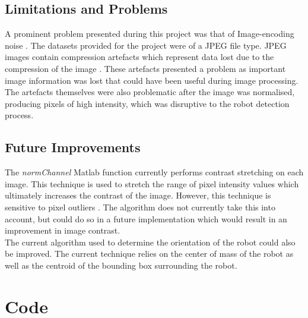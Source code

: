 \documentclass{article}
\begin{document}
\subsection{Limitations and Problems}
\label{sec:limits}
A prominent problem presented during this project was that of Image-encoding noise \cite{ref:digitalProcessing}. The datasets provided for the project were of a JPEG file type. JPEG images contain compression artefacts which represent data lost due to the compression of the image \cite{ref:digitalProcessing}. These artefacts presented a problem as important image information was lost that could have been useful during image processing. The artefacts themselves were also problematic after the image was normalised, producing pixels of high intensity, which was disruptive to the robot detection process. 

 

\subsection{Future Improvements}
\label{sec:improve}
The \textit{normChannel} Matlab function currently performs contrast stretching on each image. This technique is used to stretch the range of pixel intensity values which ultimately increases the contrast of the image. However, this technique is sensitive to pixel outliers \cite{ref:digitalProcessing}. The algorithm does not currently take this into account, but could do so in a future implementation which would result in an improvement in image contrast.\\

The current algorithm used to determine the orientation of the robot could also be improved. The current technique relies on the center of mass of the robot as well as the centroid of the bounding box surrounding the robot.



 





\section{Code}
\label{sec:code}
\end{document}
